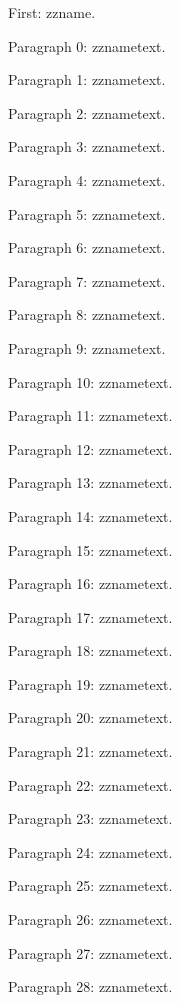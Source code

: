 \documentclass{article}
\begin{document}
\makeatletter
First: \csname zzname\endcsname.

Paragraph 0: \csname zzname\endcsname text.

Paragraph 1: \csname zzname\endcsname text.

Paragraph 2: \csname zzname\endcsname text.

Paragraph 3: \csname zzname\endcsname text.

Paragraph 4: \csname zzname\endcsname text.

Paragraph 5: \csname zzname\endcsname text.

Paragraph 6: \csname zzname\endcsname text.

Paragraph 7: \csname zzname\endcsname text.

Paragraph 8: \csname zzname\endcsname text.

Paragraph 9: \csname zzname\endcsname text.

Paragraph 10: \csname zzname\endcsname text.

Paragraph 11: \csname zzname\endcsname text.

Paragraph 12: \csname zzname\endcsname text.

Paragraph 13: \csname zzname\endcsname text.

Paragraph 14: \csname zzname\endcsname text.

Paragraph 15: \csname zzname\endcsname text.

Paragraph 16: \csname zzname\endcsname text.

Paragraph 17: \csname zzname\endcsname text.

Paragraph 18: \csname zzname\endcsname text.

Paragraph 19: \csname zzname\endcsname text.

Paragraph 20: \csname zzname\endcsname text.

Paragraph 21: \csname zzname\endcsname text.

Paragraph 22: \csname zzname\endcsname text.

Paragraph 23: \csname zzname\endcsname text.

Paragraph 24: \csname zzname\endcsname text.

Paragraph 25: \csname zzname\endcsname text.

Paragraph 26: \csname zzname\endcsname text.

Paragraph 27: \csname zzname\endcsname text.

Paragraph 28: \csname zzname\endcsname text.
\end{document}
